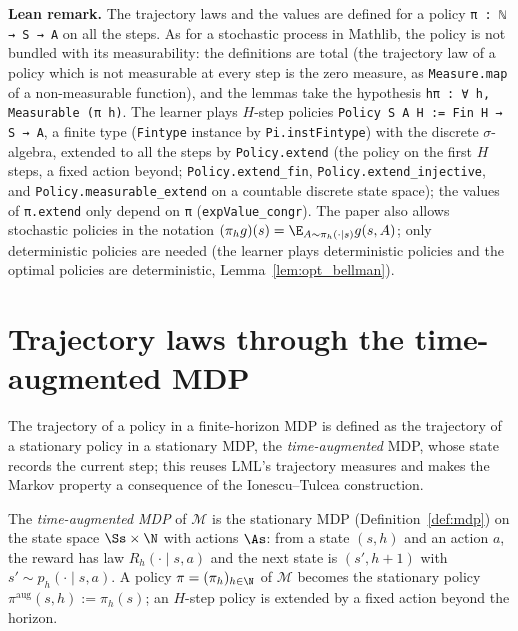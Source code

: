 \textbf{Lean remark.} The trajectory laws and the values are defined for a policy
\texttt{π : ℕ → S → A} on all the steps. As for a stochastic process in Mathlib, the policy is not
bundled with its measurability: the definitions are total (the trajectory law of a policy which
is not measurable at every step is the zero measure, as \texttt{Measure.map} of a non-measurable
function), and the lemmas take the hypothesis \texttt{hπ : ∀ h, Measurable (π h)}. The learner
plays $H$-step policies \texttt{Policy S A H := Fin H → S → A}, a finite type (\texttt{Fintype}
instance by \texttt{Pi.instFintype}) with the discrete $\sigma$-algebra, extended to all the steps
by \texttt{Policy.extend} (the policy on the first $H$ steps, a fixed action beyond;
\texttt{Policy.extend\_fin}, \texttt{Policy.extend\_injective}, and
\texttt{Policy.measurable\_extend} on a countable discrete state space); the values of
\texttt{π.extend} only depend on \texttt{π} (\texttt{expValue\_congr}). The paper also allows
stochastic policies in the notation $(\pi_h g)(s) = \E_{A \sim \pi_h(\cdot \mid s)} g(s, A)$;
only deterministic policies are needed (the learner plays deterministic policies and the
optimal policies are deterministic, Lemma~\ref{lem:opt_bellman}).

\section{Trajectory laws through the time-augmented MDP}
\label{sec:mdp_trajectories}

The trajectory of a policy in a finite-horizon MDP is defined as the trajectory of a
stationary policy in a stationary MDP, the \emph{time-augmented} MDP, whose state records the
current step; this reuses LML's trajectory measures and makes the Markov property a consequence
of the Ionescu--Tulcea construction.

\begin{definition}\label{def:layered_mdp}
\leanok
{}
The \emph{time-augmented MDP} of $\mathcal M$ is the stationary MDP (Definition~\ref{def:mdp})
on the state space $\Ss \times \N$ with actions $\As$: from a state $(s, h)$ and an action $a$,
the reward has law $R_h(\cdot \mid s, a)$ and the next state is $(s', h + 1)$ with
$s' \sim p_h(\cdot \mid s, a)$. A policy $\pi = (\pi_h)_{h \in \N}$ of $\mathcal M$ becomes the
stationary policy $\pi^{\mathrm{aug}}(s, h) := \pi_h(s)$; an $H$-step policy is extended by a
fixed action beyond the horizon.
\end{definition}

